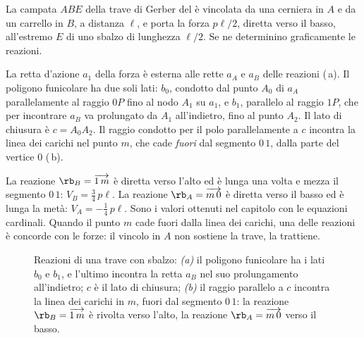 \begin{esempio}
	\label{ese:sbalzo_sgr}
	La campata $ABE$ della trave di Gerber del  è vincolata da una cerniera
	in $A$ e da un carrello in $B$, a distanza $\ell$, e porta la forza $p\ell/2$, diretta verso il
	basso, all'estremo $E$ di uno sbalzo di lunghezza $\ell/2$. Se ne determinino graficamente le
	reazioni.

	\begin{svolgimento}
		La retta d'azione $a_1$ della forza è esterna alle rette $a_A$ e $a_B$ delle reazioni
		(\,a). Il poligono funicolare ha due soli lati: $b_0$, condotto dal punto
		$A_0$ di $a_A$ parallelamente al raggio $0P$ fino al nodo $A_1$ su $a_1$, e $b_1$, parallelo
		al raggio $1P$, che per incontrare $a_B$ va prolungato da $A_1$ all'indietro, fino al punto
		$A_2$. Il lato di chiusura è $c = A_0A_2$. Il raggio condotto per il polo parallelamente a $c$
		incontra la linea dei carichi nel punto $m$, che cade \emph{fuori} dal segmento $0\,1$, dalla
		parte del vertice $0$ (\,b).

		La reazione $\rb_B = \overrightarrow{1\,m}$ è diretta verso l'alto ed è lunga una volta e
		mezza il segmento $0\,1$: $V_B = \tfrac{3}{4}\,p\ell$. La reazione
		$\rb_A = \overrightarrow{m\,0}$ è diretta verso il basso ed è lunga la metà:
		$V_A = -\tfrac{1}{4}\,p\ell$. Sono i valori ottenuti nel capitolo con le equazioni cardinali.
		Quando il punto $m$ cade fuori dalla linea dei carichi, una delle reazioni è concorde con le
		forze: il vincolo in $A$ non sostiene la trave, la trattiene.
	\end{svolgimento}
\end{esempio}

\begin{figure}[htbp]
	\centering
	\caption{Reazioni di una trave con sbalzo: \emph{(a)} il poligono funicolare ha i lati $b_0$ e
		$b_1$, e l'ultimo incontra la retta $a_B$ nel suo prolungamento all'indietro; $c$ è il lato di
		chiusura; \emph{(b)} il raggio parallelo a $c$ incontra la linea dei carichi in $m$, fuori dal
		segmento $0\,1$: la reazione $\rb_B = \protect\overrightarrow{1\,m}$ è rivolta verso l'alto,
		la reazione $\rb_A = \protect\overrightarrow{m\,0}$ verso il basso.}
	\label{fig:sbalzo_sgr}
\end{figure}

